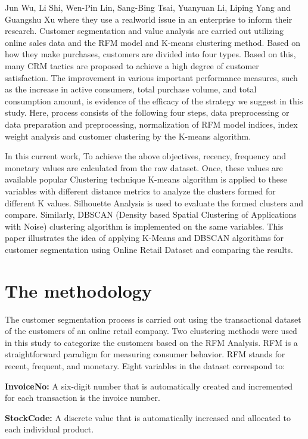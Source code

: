 \documentclass[conference]{IEEEtran}
\begin{document}
Jun Wu, Li Shi, Wen-Pin Lin, Sang-Bing Tsai, Yuanyuan Li, Liping Yang and Guangshu Xu \cite{b15} where they use a realworld issue in an enterprise to inform their research. Customer segmentation and value analysis are carried out utilizing online sales data and the RFM model and K-means clustering method. Based on how they make purchases, customers are divided into four types. Based on this, many CRM tactics are proposed to achieve a high degree of customer satisfaction. The improvement in various important performance measures, such as the increase in active consumers, total purchase volume, and total consumption amount, is evidence of the efficacy of the strategy we suggest in this study. Here, process consists of the following four steps, data preprocessing or data preparation and preprocessing, normalization of RFM model indices, index weight analysis and customer clustering by the K-means algorithm.

In this current work, To achieve the above objectives, recency, frequency and monetary values are calculated from the raw dataset. Once, these values are available popular Clustering technique K-means algorithm is applied to these variables with different distance metrics to analyze the clusters formed for different K values. Silhouette Analysis is used to evaluate the formed clusters and compare. Similarly, DBSCAN (Density based Spatial Clustering of Applications with Noise) clustering algorithm is implemented on the same variables. This paper illustrates the idea of applying K-Means and DBSCAN algorithms for customer segmentation using Online Retail Dataset and comparing the results.

\section{The methodology }

The customer segmentation process is carried out using the transactional dataset of the customers of an online retail company. Two clustering methods were used in this study to categorize the customers based on the RFM Analysis. RFM is a straightforward paradigm for measuring consumer behavior. RFM stands for recent, frequent, and monetary. Eight variables in the dataset correspond to:

 \textbf{InvoiceNo:} A six-digit number that is automatically created and incremented for each transaction is the invoice number.
 
 \textbf{StockCode:} A discrete value that is automatically increased and allocated to each individual product.
 
\end{document}
